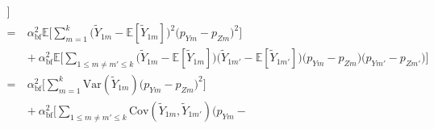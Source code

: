 \documentclass[twoside,11pt]{article}
\newcommand{\rvTwo}{Y}
\newcommand{\rvThree}{Z}
\newcommand{\private}[1]{\tilde{#1}}
\newcommand{\mE}{\mathbb{E}} %
\newcommand{\alphabetSize}{k} %
\newcommand{\vectorIndex}{m}
\newcommand{\probVecElement}[2]{p_{{#1}{#2}}}
\newcommand{\privacyParameter}{\alpha} %
\newcommand{\privacyParameterrappor}{\privacyParameter_{\mathrm{bf}}}
\begin{document}
\begin{appendix}
\begin{align*}
		\biggr] %
		\\= ~&
		\privacyParameterrappor^2
		\mE %
		\biggl[ %
		\sum_{\vectorIndex=1}^\alphabetSize
		\bigl( %
		\private{\rvTwo}_{1 \vectorIndex}
		- %
		\mE [ \private{\rvTwo}_{1 \vectorIndex}]
		\bigr)^2 %
		\bigl( %
		\probVecElement{\rvTwo}{\vectorIndex}
		- %
		\probVecElement{\rvThree}{\vectorIndex}
		\bigr)^2 %
		\biggr] %
		\\ &+~
		\privacyParameterrappor^2
		\mE 
		\biggl[ %
		\sum_{1 \leq \vectorIndex \neq \vectorIndex' \leq \alphabetSize}
		\bigl( %
		\private{\rvTwo}_{1 \vectorIndex}
		- %
		\mE [ \private{\rvTwo}_{1 \vectorIndex}]
		\bigr) %
		\bigl( %
		\private{\rvTwo}_{1 \vectorIndex'}
		- %
		\mE [ \private{\rvTwo}_{1 \vectorIndex'}]
		\bigr) %
		\bigl( %
		\probVecElement{\rvTwo}{\vectorIndex}
		- %
		\probVecElement{\rvThree}{\vectorIndex}
		\bigr) %
		\bigl( %
		\probVecElement{\rvTwo}{\vectorIndex'}
		- %
		\probVecElement{\rvThree}{\vectorIndex'}
		\bigr) %
		\biggr] %
		\\= ~&%
		\privacyParameterrappor^2
		\biggl[ %
		\sum_{\vectorIndex=1}^\alphabetSize
		\mathrm{Var}
		( %
		\private{\rvTwo}_{1 \vectorIndex}
		) %
		\bigl( %
		\probVecElement{\rvTwo}{\vectorIndex}
		- %
		\probVecElement{\rvThree}{\vectorIndex}
		\bigr)^2 %
		\biggr] %
		\\ &+~
		\privacyParameterrappor^2
		\biggl[ %
		\sum_{1 \leq \vectorIndex \neq \vectorIndex' \leq \alphabetSize}
		\mathrm{Cov}
		(
		\private{\rvTwo}_{1 \vectorIndex},
		\private{\rvTwo}_{1 \vectorIndex'}
		) %
		\bigl( %
		\probVecElement{\rvTwo}{\vectorIndex}
		- %

\end{align*}
\end{appendix}
\end{document}
